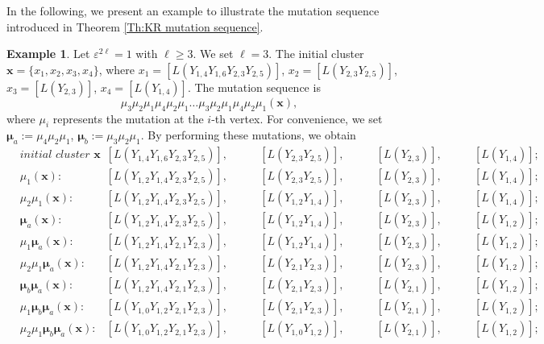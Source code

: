 \documentclass[11pt, reqno]{amsart}
\theoremstyle{plain}
\theoremstyle{definition}
\newtheorem{example}[theorem]{Example}
\numberwithin{equation}{section}
\begin{document}
In the following, we present an example to illustrate the mutation sequence introduced in Theorem \ref{Th:KR mutation sequence}.
\begin{example}
Let $\varepsilon^{2 \ell}=1$ with $\ell\geq 3$. We set $\ell=3$. The initial cluster $\mathbf{x}=\{x_1, x_2, x_3, x_4\}$, where $x_1=[L(Y_{1,4}Y_{1,6}Y_{2,3}Y_{2,5})]$, $x_2=[L(Y_{2,3}Y_{2,5})]$, $x_3=[L(Y_{2,3})]$, $x_4=[L(Y_{1,4})]$. The mutation sequence is 
\[
\mu_3\mu_2\mu_1\mu_4 \mu_2\mu_1\ldots \mu_3\mu_2\mu_1\mu_4\mu_2\mu_1(\mathbf{x}),
\]
where $\mu_i$ represents the mutation at the $i$-th vertex. For convenience, we set $\boldsymbol{\mu}_a:= \mu_4\mu_2\mu_1$, $\boldsymbol{\mu}_b:= \mu_3\mu_2\mu_1$. By performing these mutations, we obtain
\begin{align*}
&\textit{initial cluster $\mathbf{x}$}:  &[L(Y_{1,4}Y_{1,6}Y_{2,3}Y_{2,5})], \quad\quad  &[L(Y_{2,3}Y_{2,5})],\quad\quad  &[L(Y_{2,3})], \quad\quad &[L(Y_{1,4})];\\
&\mu_1(\mathbf{x}):  &[L(Y_{1,2}Y_{1,4}Y_{2,3}Y_{2,5})], \quad\quad &[L(Y_{2,3}Y_{2,5})],  \quad\quad  &[L(Y_{2,3})], \quad\quad &[L(Y_{1,4})];\\
&\mu_2\mu_1(\mathbf{x}):  &[L(Y_{1,2}Y_{1,4}Y_{2,3}Y_{2,5})], \quad\quad &[L(Y_{1,2}Y_{1,4})],  \quad\quad  &[L(Y_{2,3})], \quad\quad &[L(Y_{1,4})];\\
&\boldsymbol{\mu}_a(\mathbf{x}):  &[L(Y_{1,2}Y_{1,4}Y_{2,3}Y_{2,5})], \quad\quad &[L(Y_{1,2}Y_{1,4})],  \quad\quad  &[L(Y_{2,3})], \quad\quad &[L(Y_{1,2})];\\
&\mu_1\boldsymbol{\mu}_a(\mathbf{x}):  &[L(Y_{1,2}Y_{1,4}Y_{2,1}Y_{2,3})], \quad\quad &[L(Y_{1,2}Y_{1,4})],  \quad\quad  &[L(Y_{2,3})], \quad\quad &[L(Y_{1,2})];\\
&\mu_2\mu_1\boldsymbol{\mu}_a(\mathbf{x}):  &[L(Y_{1,2}Y_{1,4}Y_{2,1}Y_{2,3})], \quad\quad &[L(Y_{2,1}Y_{2,3})],  \quad\quad  &[L(Y_{2,3})], \quad\quad &[L(Y_{1,2})];\\
&\boldsymbol{\mu}_b\boldsymbol{\mu}_a(\mathbf{x}):  &[L(Y_{1,2}Y_{1,4}Y_{2,1}Y_{2,3})], \quad\quad &[L(Y_{2,1}Y_{2,3})],  \quad\quad  &[L(Y_{2,1})], \quad\quad &[L(Y_{1,2})];\\
&\mu_1\boldsymbol{\mu}_b\boldsymbol{\mu}_a(\mathbf{x}):  &[L(Y_{1,0}Y_{1,2}Y_{2,1}Y_{2,3})], \quad\quad &[L(Y_{2,1}Y_{2,3})],  \quad\quad  &[L(Y_{2,1})], \quad\quad &[L(Y_{1,2})];\\
&\mu_2\mu_1\boldsymbol{\mu}_b\boldsymbol{\mu}_a(\mathbf{x}):  &[L(Y_{1,0}Y_{1,2}Y_{2,1}Y_{2,3})], \quad\quad &[L(Y_{1,0}Y_{1,2})],  \quad\quad  &[L(Y_{2,1})], \quad\quad &[L(Y_{1,2})];\\

\end{align*}
\end{example}
\end{document}
